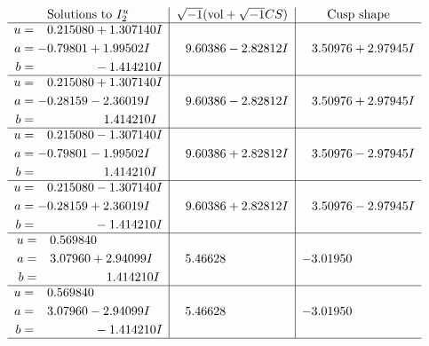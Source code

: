 \documentclass[1p]{elsarticle_modified}
\theoremstyle{definition}
\newcommand{\I}{\sqrt{-1}}
\begin{document}
$$\begin{array}{c|c|c}  
\text{Solutions to }I^u_{2}& \I (\text{vol} + \sqrt{-1}CS) & \text{Cusp shape}\\
 \hline 
\begin{aligned}
u &= \phantom{-}0.215080 + 1.307140 I \\
a &= -0.79801 + 1.99502 I \\
b &= \phantom{-0.000000 } -1.414210 I\end{aligned}
 & \phantom{-}9.60386 - 2.82812 I & \phantom{-}3.50976 + 2.97945 I \\ \hline\begin{aligned}
u &= \phantom{-}0.215080 + 1.307140 I \\
a &= -0.28159 - 2.36019 I \\
b &= \phantom{-0.000000 -}1.414210 I\end{aligned}
 & \phantom{-}9.60386 - 2.82812 I & \phantom{-}3.50976 + 2.97945 I \\ \hline\begin{aligned}
u &= \phantom{-}0.215080 - 1.307140 I \\
a &= -0.79801 - 1.99502 I \\
b &= \phantom{-0.000000 -}1.414210 I\end{aligned}
 & \phantom{-}9.60386 + 2.82812 I & \phantom{-}3.50976 - 2.97945 I \\ \hline\begin{aligned}
u &= \phantom{-}0.215080 - 1.307140 I \\
a &= -0.28159 + 2.36019 I \\
b &= \phantom{-0.000000 } -1.414210 I\end{aligned}
 & \phantom{-}9.60386 + 2.82812 I & \phantom{-}3.50976 - 2.97945 I \\ \hline\begin{aligned}
u &= \phantom{-}0.569840\phantom{ +0.000000I} \\
a &= \phantom{-}3.07960 + 2.94099 I \\
b &= \phantom{-0.000000 -}1.414210 I\end{aligned}
 & \phantom{-}5.46628\phantom{ +0.000000I} & -3.01950\phantom{ +0.000000I} \\ \hline\begin{aligned}
u &= \phantom{-}0.569840\phantom{ +0.000000I} \\
a &= \phantom{-}3.07960 - 2.94099 I \\
b &= \phantom{-0.000000 } -1.414210 I\end{aligned}
 & \phantom{-}5.46628\phantom{ +0.000000I} & -3.01950\phantom{ +0.000000I}\\
 \hline 
 \end{array}$$\newpage\newpage\renewcommand{\arraystretch}{1}
\end{document}
